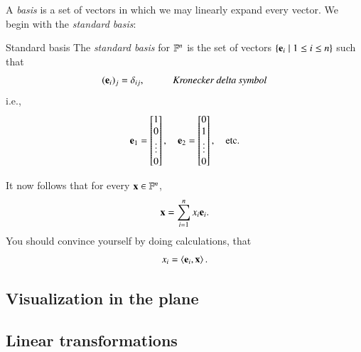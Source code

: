 
A \emph{basis} is a set of vectors in which we may linearly expand every vector. We begin with the \emph{standard basis}:
\begin{myDefinition}{Standard basis}{}
The \emph{standard basis} for $\mathbb{F}^n$ is the set of vectors $\{\mathbf{e}_i \mid 1 \leq i \leq n\}$ such that
\begin{equation}
    (\bvec{e}_i)_j = \delta_{ij}, \axiomname{Kronecker delta symbol}
\end{equation}
i.e., 
\begin{equation}
    \mathbf{e}_1 = \begin{bmatrix} 1 \\ 0 \\ \vdots \\ 0\end{bmatrix}, \quad
    \mathbf{e}_2 = \begin{bmatrix} 0 \\ 1 \\ \vdots \\ 0\end{bmatrix}, \quad\text{etc.}
\end{equation}
\end{myDefinition}
It now follows that for every $\mathbf{x}\in\mathbb{F}^n$,
\begin{equation}
    \mathbf{x} = \sum_{i=1}^n x_i \mathbf{e}_i.
\end{equation}
You should convince yourself by doing calculations, that 
\begin{equation}
    x_i = \braket{\mathbf{e}_i,\mathbf{x}}.
\end{equation}


\subsection{Visualization in the plane}


\subsection{Linear transformations}

